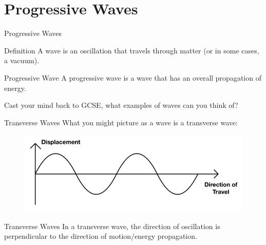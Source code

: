 \documentclass[../Main.tex]{subfiles}
\begin{document}
\author{Progressive Waves} %
\date{Year 1 Topic 16} %

\section{Progressive Waves} %

\begin{frame}{Progressive Waves}
    \begin{block}{Definition}
    A wave is an oscillation that travels through matter (or in some cases, a vacuum).  
    \end{block}
    
    \pause
    \begin{block}{Progressive Wave}
    A progressive wave is a wave that has an overall propagation of energy. 
    \end{block}
    
    \pause
    Cast your mind back to GCSE, what examples of waves can you think of?
\end{frame}

\begin{frame}{Transverse Waves}
    What you might picture as a wave is a transverse wave:
    \begin{figure}
        \centering
        \includegraphics[width=\textwidth]{Waves_Images/transversewave.png}
    \end{figure}
    
    \begin{block}{Transverse Waves}
    In a transverse wave, the direction of oscillation is perpendicular to the direction of motion/energy propagation.
    \end{block}
\end{frame}
\end{document}
